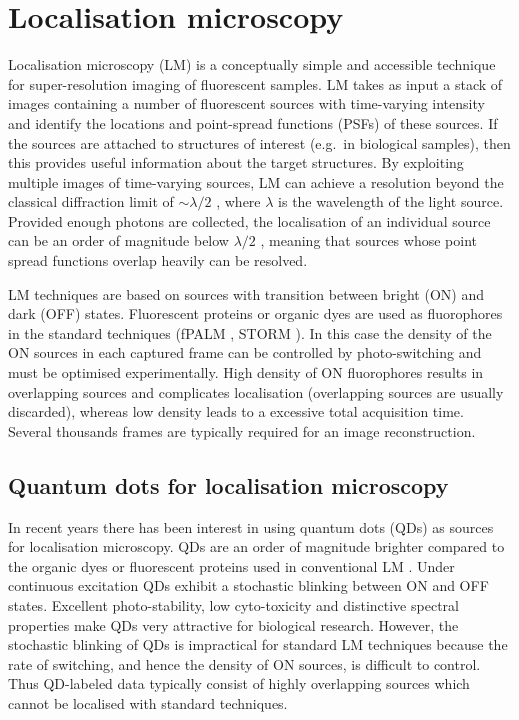 \section{Localisation microscopy\label{sec:LM}}

Localisation microscopy (LM) is a conceptually simple and accessible technique for super-resolution imaging of fluorescent samples. LM takes as input a stack of images containing a number of fluorescent sources with time-varying intensity and identify the locations and point-spread functions (PSFs) of these sources. If the sources are attached to structures of interest (e.g.\ in biological samples), then this provides useful information about the target structures. By exploiting multiple images of time-varying sources, LM can achieve a resolution beyond the classical diffraction limit of $\sim \lambda/2$ \cite{Abbe1873}, where $\lambda$ is the wavelength of the light source. Provided enough photons are collected, the localisation of an individual source can be an order of magnitude below $\lambda/2$ \cite{Ober2004}, meaning that sources whose point spread functions overlap heavily can be resolved. 

LM techniques are based on sources with transition between bright (ON) and dark (OFF) states. Fluorescent proteins or organic dyes are used as fluorophores in the standard techniques (fPALM \cite{Hess2006}, STORM \cite{Rust2006}). In this case the density of the ON sources in each captured frame can be controlled by photo-switching and must be optimised experimentally. High density of ON fluorophores results in overlapping sources and complicates localisation (overlapping sources are usually discarded), whereas low density leads to a excessive total acquisition time. Several thousands frames are typically required for an image reconstruction.


\subsection{Quantum dots for localisation microscopy\label{sec:QD for LM}}

In recent years there has been interest in using quantum dots (QDs) as sources for localisation microscopy. QDs are an order of magnitude brighter compared to the organic dyes or fluorescent proteins used in conventional LM \cite{Resch-Genger2008}. Under continuous excitation QDs exhibit a stochastic blinking between ON and OFF states. Excellent photo-stability, low cyto-toxicity and distinctive spectral properties make QDs very attractive for biological research. However, the stochastic blinking of QDs is impractical for standard LM techniques because the rate of switching, and hence the density of ON sources, is difficult to control. Thus QD-labeled data typically consist of highly overlapping sources which cannot be localised with standard techniques.

